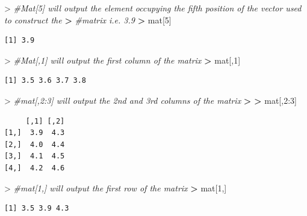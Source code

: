 \documentclass[
]{book}
\newenvironment{Shaded}{\begin{snugshade}}{\end{snugshade}}
\newcommand{\CommentTok}[1]{\textcolor[rgb]{0.56,0.35,0.01}{\textit{#1}}}
\newcommand{\DecValTok}[1]{\textcolor[rgb]{0.00,0.00,0.81}{#1}}
\newcommand{\ErrorTok}[1]{\textcolor[rgb]{0.64,0.00,0.00}{\textbf{#1}}}
\newcommand{\NormalTok}[1]{#1}
\newcommand{\SpecialCharTok}[1]{\textcolor[rgb]{0.00,0.00,0.00}{#1}}
\theoremstyle{definition}
\theoremstyle{definition}
\theoremstyle{definition}
\theoremstyle{definition}
\theoremstyle{remark}
\begin{document}
\begin{Shaded}
\begin{Highlighting}[]
\SpecialCharTok{\textgreater{}} \CommentTok{\#Mat[5] will output the element occupying the fifth position of the vector used to construct the}
\ErrorTok{\textgreater{}} \CommentTok{\#matrix i.e. 3.9}
\ErrorTok{\textgreater{}}\NormalTok{ mat[}\DecValTok{5}\NormalTok{]}
\end{Highlighting}
\end{Shaded}

\begin{verbatim}
[1] 3.9
\end{verbatim}

\begin{Shaded}
\begin{Highlighting}[]
\SpecialCharTok{\textgreater{}} \CommentTok{\#Mat[,1] will output the first column of the matrix}
\ErrorTok{\textgreater{}}\NormalTok{ mat[,}\DecValTok{1}\NormalTok{]}
\end{Highlighting}
\end{Shaded}

\begin{verbatim}
[1] 3.5 3.6 3.7 3.8
\end{verbatim}

\begin{Shaded}
\begin{Highlighting}[]
\SpecialCharTok{\textgreater{}} \CommentTok{\#mat[,2:3] will output the 2nd and 3rd columns of the matrix }
\ErrorTok{\textgreater{}} 
\ErrorTok{\textgreater{}}\NormalTok{ mat[,}\DecValTok{2}\SpecialCharTok{:}\DecValTok{3}\NormalTok{]}
\end{Highlighting}
\end{Shaded}

\begin{verbatim}
     [,1] [,2]
[1,]  3.9  4.3
[2,]  4.0  4.4
[3,]  4.1  4.5
[4,]  4.2  4.6
\end{verbatim}

\begin{Shaded}
\begin{Highlighting}[]
\SpecialCharTok{\textgreater{}} \CommentTok{\#mat[1,] will output the first row of the matrix}
\ErrorTok{\textgreater{}}\NormalTok{ mat[}\DecValTok{1}\NormalTok{,]}
\end{Highlighting}
\end{Shaded}

\begin{verbatim}
[1] 3.5 3.9 4.3
\end{verbatim}
\end{document}
